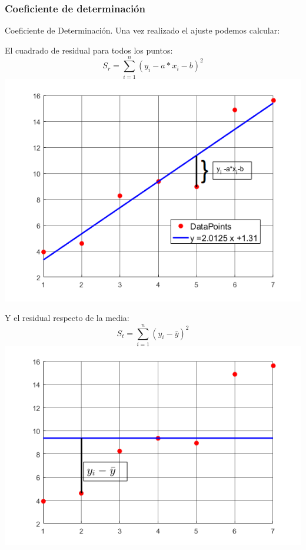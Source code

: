 \documentclass[xcolor=svgnames]{beamer} %
\theoremstyle{plain}
\theoremstyle{definition}
\begin{document}
\subsubsection{Coeficiente de determinación}

\begin{frame}{Coeficiente de Determinación.}
Una vez realizado el ajuste podemos calcular:

  \begin{minipage}{.45\linewidth}
  
    El cuadrado de residual para todos los puntos:
    $$S_r = \sum_{i=1}^n (y_i - a*x_i -b)^2 $$
    \includegraphics[width=\linewidth]{resid.png} 
  \end{minipage} \begin{minipage}{.45\linewidth}
	Y el residual respecto de la media:
	$$S_t = \sum_{i=1}^n (y_i - \bar y)^2 $$
    \includegraphics[width=\linewidth]{residm.png} 
  \end{minipage}

\end{frame}
\end{document}
